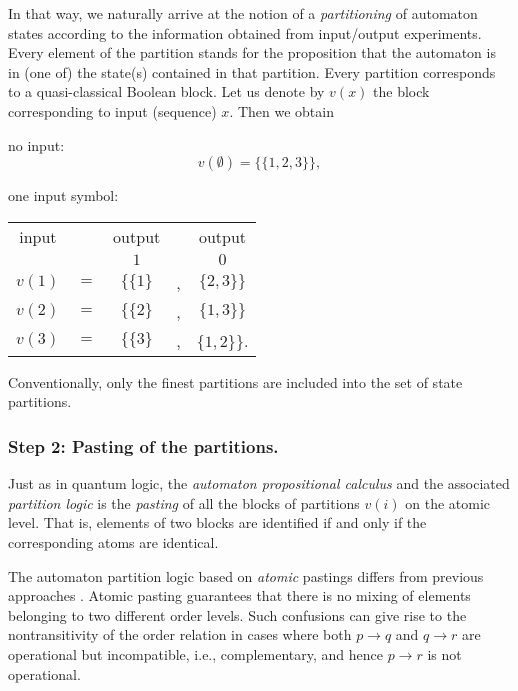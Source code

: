 \documentclass [11pt]{llncs}
\begin{document}
In that way, we naturally arrive at the notion of a {\em partitioning}
of automaton states according to the information obtained from
input/output
experiments. Every element of the partition stands for the proposition
that the automaton is in (one of) the state(s) contained in that
partition. Every partition corresponds to a quasi-classical
Boolean block. Let us denote by $v(x)$ the block corresponding to input
(sequence) $x$. Then we obtain
\begin{description}
\item
no input:
$$v(\emptyset )=\{\{1,2,3\}\},$$
\item
one input symbol:
\begin{center}
\begin{tabular}{ccccc}
\hline\hline
input &&output&& output \\
 &&{$1$}&&   {$0$}\\
\hline
{$v(1)$}&${=}$&{$\{\{1\}$}&{,}&${\{2,3\}\}}$\\
{$v(2)$}&${=}$&{$\{\{2\}$}&{,}&${\{1,3\}\}}$\\
{$v(3)$}&${=}$&{$\{\{3\}$}&,&${\{1,2\}\}}$.\\
\hline\hline
\end{tabular}
\end{center}
\end{description}
Conventionally, only the finest partitions are included into
the set of state partitions.


\subsubsection*{Step 2: Pasting of the partitions.}

Just as in quantum logic, the {\em automaton propositional calculus} and
the associated
{\em partition logic} is the {\em pasting} of all the blocks of
partitions
$v(i)$ on the atomic level. That is, elements of two blocks are
identified if and only if the corresponding atoms are
identical.

The automaton partition logic based on {\em atomic} pastings  differs
from previous approaches
\cite{svozil-93,schaller-92,schaller-95,schaller-96,dvur-pul-svo,svo:za,svozil-tkadlec,cal-sv-yu}.
Atomic pasting guarantees that there is no mixing of elements
belonging to two different order levels.
Such confusions can give rise
to the nontransitivity of the order relation \cite{svozil-93} in cases
where both $p\rightarrow q$ and $q\rightarrow r$ are operational
but incompatible, i.e., complementary, and hence $p\rightarrow r$ is not
operational.
\end{document}
